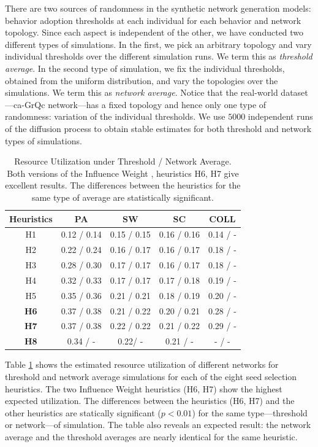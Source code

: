 \documentclass[letterpaper]{article}
\theoremstyle{plain} 		\newtheorem{thm}{Theorem}[section]
\theoremstyle{definition} 	\newtheorem{defn}[thm]{Definition}
\theoremstyle{remark}		\newtheorem{rem}{Remark}
\begin{document}
There are two sources of randomness in the synthetic network generation models:  behavior adoption thresholds at each individual for each behavior and network topology. Since each aspect is independent of the other, we have conducted two different types of simulations. In the first, we pick an arbitrary topology and vary individual thresholds over the different simulation runs. We term this as \textit{threshold average}. In the second type of simulation, we fix the individual thresholds, obtained from the uniform distribution, and vary the topologies over the simulations. We term this as \textit{network average}. Notice that the real-world dataset---ca-GrQc network---has a fixed topology and hence only one type of randomness: variation of the individual thresholds.  We use $5000$ independent runs of the diffusion process to obtain stable estimates for both threshold and network types of simulations.

\begin{table}[htb]\footnotesize
\centering
    \caption{Resource Utilization under Threshold / Network Average. Both versions of the Influence Weight , heuristics H6, H7 give excellent results. The differences between the heuristics for the same type of average are statistically significant.}\label{tab:seed-selection-util}
    \begin{tabular}{ccccc} \toprule
        Heuristics & PA & SW & SC & COLL \\ \midrule
        H1 & 0.12 / 0.14 & 0.15 / 0.15  & 0.16 / 0.16 & 0.14 / -\\
        H2 & 0.22 / 0.24 & 0.16 / 0.17 & 0.16 / 0.17 & 0.18 / -\\
        H3 & 0.28 / 0.30 & 0.17 / 0.17 & 0.16 / 0.17 & 0.18 / -\\
        H4 & 0.32 / 0.33 & 0.17 / 0.17 & 0.17 / 0.18 & 0.19 / - \\
        H5 & 0.35 / 0.36 & 0.21 / 0.21 & 0.18 / 0.19 & 0.20 / - \\
        \textbf{H6} & 0.37 / 0.38 & 0.21 / 0.22 & 0.20 / 0.21& 0.28 / -\\
        \textbf{H7} & 0.37 / 0.38 & 0.22 / 0.22 & 0.21 / 0.22& 0.29 / -\\ 
        \textbf{H8} & 0.34 / - &  0.22/ - &  0.21 / - & - / -\\ \bottomrule
    \end{tabular}
\end{table}

Table \ref{tab:seed-selection-util} shows the estimated resource utilization of different networks for threshold and network average simulations for each of the eight seed selection heuristics. The two Influence Weight  heuristics (H6, H7) show the highest expected utilization. The differences between the heuristics (H6, H7) and the other heuristics are statically significant ($p < 0.01$) for the same type---threshold or network---of simulation. The table also reveals an expected result: the network average and the threshold averages are nearly identical for the same heuristic. 
\end{document}
